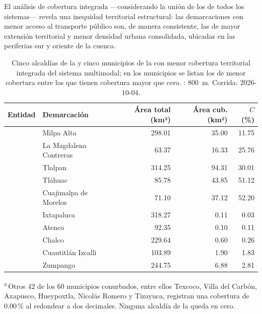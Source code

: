 \label{subsubsec:cobertura-deficit}

El análisis de cobertura integrada —considerando la unión de los
 de todos los sistemas— revela una inequidad territorial
estructural: las demarcaciones con menor acceso al transporte público son, de
manera consistente, las de mayor extensión territorial y menor densidad urbana
consolidada, ubicadas en las periferias sur y oriente de la cuenca.

\begin{table}[H]
    \centering
    \caption[Demarcaciones con menor cobertura de transporte público]{
    Cinco alcaldías de la \cdmx{} y cinco municipios de la \zmvm{} con menor
    cobertura territorial integrada del sistema multimodal; en los municipios
    se listan los de menor cobertura entre los que tienen cobertura mayor que
    cero. : 800~m. Corrida: 2026-10-04.}
    \label{tab:cobertura-deficit}
    \begin{tabular}{|l|l|r|r|r|}
        \hline
        \textbf{Entidad} & \textbf{Demarcación} &
        \textbf{Área total (km²)} & \textbf{Área cub. (km²)} &
        \textbf{$C$ (\%)} \\
        \hline
            & Milpa Alta              & 298.01 &  35.00 & 11.75 \\
            & La Magdalena Contreras  &  63.37 &  16.33 & 25.76 \\
            & Tlalpan                 & 314.25 &  94.31 & 30.01 \\
            & Tláhuac                 &  85.78 &  43.85 & 51.12 \\
            & Cuajimalpa de Morelos   &  71.10 &  37.12 & 52.20 \\
        \hline
            & Ixtapaluca         & 318.27 & 0.11 & 0.03 \\
            & Atenco             &  92.35 & 0.10 & 0.11 \\
            & Chalco             & 229.64 & 0.60 & 0.26 \\
            & Cuautitlán Izcalli & 103.89 & 1.90 & 1.83 \\
            & Zumpango           & 244.75 & 6.88 & 2.81 \\
        \hline
    \end{tabular}
    \vspace{0.4em}

    \noindent\textsuperscript{a}\,Otros 42 de los 60 municipios conurbados,
    entre ellos Texcoco, Villa del Carbón, Axapusco, Hueypoxtla, Nicolás
    Romero y Tizayuca, registran una cobertura de 0.00\,\% al redondear a dos
    decimales. Ninguna alcaldía de la \cdmx{} queda en cero.

\end{table}


